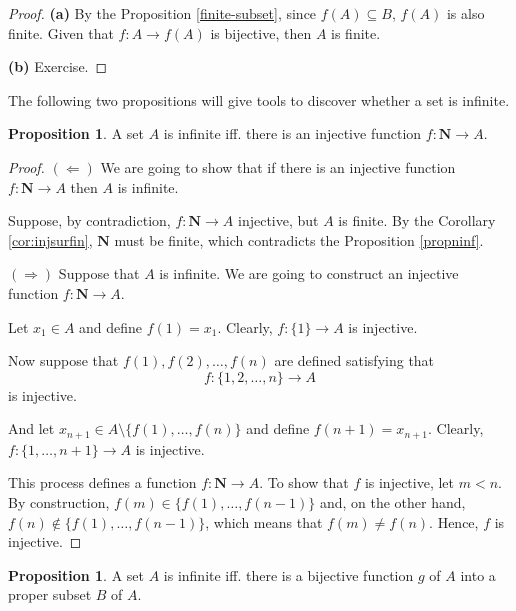 \documentclass[12pt,a4paper]{article}
\theoremstyle{definition}
\newtheorem{proposition}[theorem]{Proposition}
\begin{document}
\begin{proof}
	\textbf{(a)} By the Proposition \ref{finite-subset}, since $f(A) \subseteq B$, $f(A)$ is also finite. Given that $f : A \longrightarrow f(A)$ is bijective, then $A$ is finite.

	\textbf{(b)} Exercise.
\end{proof}

The following two propositions will give tools to discover whether a set is infinite.

\begin{proposition}\label{infprop1}
	A set $A$ is infinite iff. there is an injective function $f : \textbf{N} \longrightarrow A$.
\end{proposition}

\begin{proof}
	$(\Leftarrow)$ We are going to show that if there is an injective function $f : \textbf{N} \longrightarrow A$ then $A$ is infinite.
	
	Suppose, by contradiction, $f : \textbf{N} \longrightarrow A$ injective, but $A$ is finite. By the Corollary \ref{cor:injsurfin}, $\textbf{N}$ must be finite, which contradicts the Proposition \ref{propninf}.
	
	$(\Rightarrow)$ Suppose that $A$ is infinite. We are going to construct an injective function $f : \textbf{N} \longrightarrow A$.
	
	Let $x_1 \in A$ and define $f(1) = x_1$. Clearly, $f : \{1\} \longrightarrow A$ is injective.
	
	Now suppose that $f(1), f(2), \ldots, f(n)$ are defined satisfying that \[f : \{ 1, 2, \ldots, n \} \longrightarrow A\] is injective.
	
	And let $x_{n+1} \in A \setminus \{f(1), \ldots, f(n) \}$ and define $f(n+1) = x_{n+1}$. Clearly, $f : \{ 1, \ldots, n+1 \} \longrightarrow A$ is injective.
	
	This process defines a function $f : \textbf{N} \longrightarrow A$. To show that $f$ is injective, let $m < n$. By construction, $f(m) \in \{ f(1), \ldots, f(n-1) \}$ and, on the other hand, $f(n) \notin \{ f(1), \ldots, f(n-1) \}$, which means that $f(m) \neq f(n)$. Hence, $f$ is injective.
\end{proof}

\begin{proposition}\label{infprop2}
	A set $A$ is infinite iff. there is a bijective function $g$ of $A$ into a proper subset $B$ of $A$.
\end{proposition}
\end{document}
